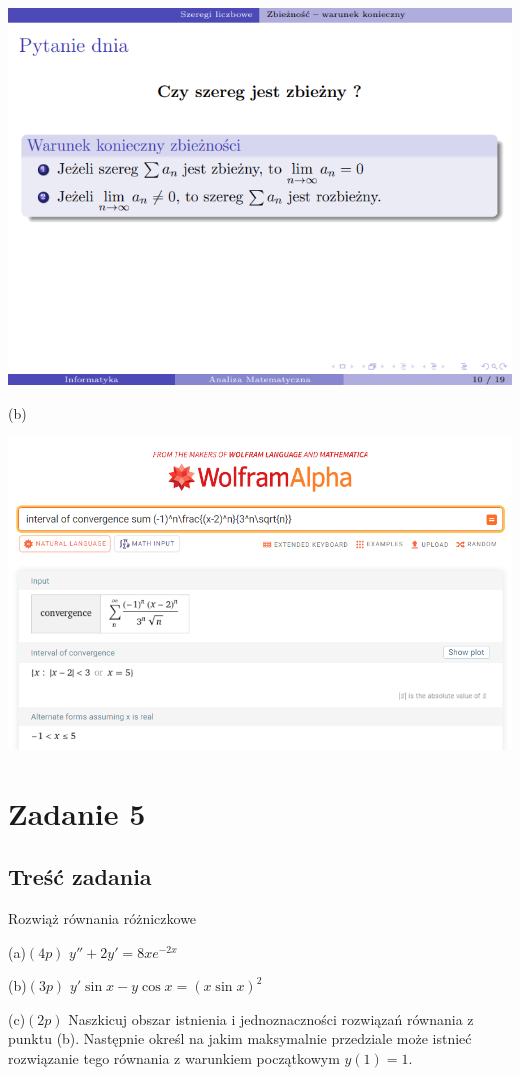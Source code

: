 \documentclass[12pt]{article}
\begin{document}
\includegraphics[scale=0.695]{am_4_a.png}

(b)

\includegraphics[scale=0.425]{am_4_b.png}

\section{Zadanie 5}
\subsection{Treść zadania}
Rozwiąż równania różniczkowe

(a)$(4p)$ $y''+2y' = 8xe^{-2x}$

(b)$(3p)$ $y' \sin x - y \cos x = (x \sin x)^2$

(c)$(2p)$ Naszkicuj obszar istnienia i jednoznaczności rozwiązań równania z punktu (b). Następnie określ na jakim maksymalnie przedziale może istnieć rozwiązanie tego równania z warunkiem początkowym $y(1) = 1$.
\end{document}
